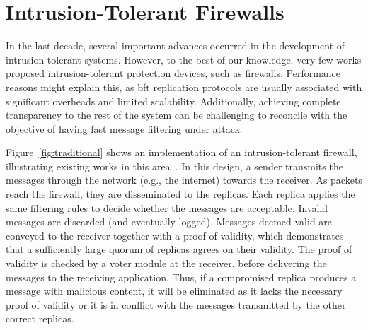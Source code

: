 

\section{Intrusion-Tolerant Firewalls}
\label{building_blocks}

In the last decade, several important advances occurred in the development of intrusion-tolerant systems.
However, to the best of our knowledge, very few works proposed intrusion-tolerant protection devices, such as firewalls.
Performance reasons might explain this, as \gls{bft} replication protocols are usually associated with significant overheads and limited scalability.
Additionally, achieving complete transparency to the rest of the system can be challenging to reconcile with the objective of having fast message filtering under attack.

Figure~\ref{fig:traditional} shows an implementation of an intrusion-tolerant firewall, illustrating  existing works in this area~\cite{Sousa:2010,Roeder:2010}.
In this design, a sender transmits the messages through the network (e.g., the internet) towards the receiver.
As packets reach the firewall, they are disseminated to the replicas. 
Each replica applies the same filtering rules to decide whether the messages are acceptable. 
Invalid messages are discarded (and eventually logged). 
Messages deemed valid are conveyed to the receiver together with a proof of validity, which demonstrates that a sufficiently large quorum of replicas agrees on their validity.
The proof of validity is checked by a voter module at the receiver, before delivering the messages to the receiving application.
Thus, if a compromised replica produces a message with malicious content, it will be eliminated as it lacks the necessary proof of validity or it is in conflict with the messages transmitted by the other correct replicas.

